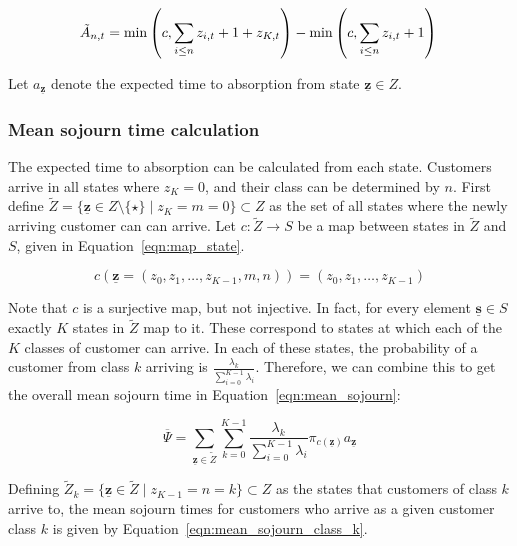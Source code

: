 \documentclass{article}
\begin{document}
\begin{equation}\label{eqn:inservice_adapt_tilde}
\tilde{A}_{n,t} =
\min\left(c, \sum_{i \leq n} z_{i,t} + 1 + z_{K,t}\right) - \min\left(c, \sum_{i \leq n} z_{i,t} + 1\right) \\
\end{equation}

Let $a_{\underline{\mathbf{z}}}$ denote the expected time to absorption
from state $\underline{\mathbf{z}} \in Z$.


\subsubsection{Mean sojourn time calculation}\label{sec:meansojourncalc}
The expected time to absorption can be calculated from each state.
Customers arrive in all states where $z_K = 0$, and their class can be
determined by $n$. First define
$\tilde{Z} = \{\underline{\mathbf{z}} \in Z\setminus\{\star\} \; | \; z_K = m = 0\} \subset Z$
as the set of all states where the newly arriving customer can can arrive.
Let $c: \tilde{Z} \rightarrow S$ be a map between states in $\tilde{Z}$ and $S$,
given in Equation~\ref{eqn:map_state}.

\begin{equation}\label{eqn:map_state}
c\left(\underline{\mathbf{z}} = (z_0, z_1, \dots, z_{K-1}, m, n) \right) = (z_0, z_1, \dots, z_{K-1})
\end{equation}

Note that $c$ is a surjective map, but not injective. In fact, for every element
$\underline{\mathbf{s}} \in S$ exactly $K$ states in $\tilde{Z}$ map to it.
These correspond to states at which each of the $K$ classes of customer can
arrive. In each of these states, the probability of a customer from class $k$
arriving is $\frac{\lambda_k}{\sum_{i=0}^{K-1} \lambda_i}$. Therefore, we can
combine this to get the overall mean sojourn time in
Equation~\ref{eqn:mean_sojourn}:

\begin{equation}\label{eqn:mean_sojourn}
\overline{\Psi} = \sum_{\underline{\mathbf{z}} \in \tilde{Z}} \sum_{k=0}^{K-1} \frac{\lambda_k}{\sum_{i=0}^{K-1} \lambda_i} \pi_{c(\underline{\mathbf{z}})} a_{\underline{\mathbf{z}}}
\end{equation}

Defining $\tilde{Z}_k = \{\underline{\mathbf{z}} \in \tilde{Z} \; | \; z_{K-1} = n = k\} \subset Z$
as the states that customers of class $k$ arrive to, the mean sojourn times for
customers who arrive as a given customer class $k$ is given by
Equation~\ref{eqn:mean_sojourn_class_k}.
\end{document}
